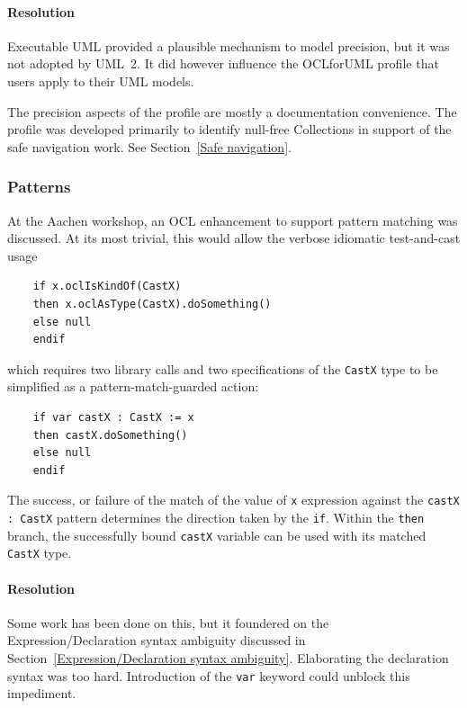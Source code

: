 \documentclass{jot}
\begin{document}
\paragraph{Resolution}

Executable UML \cite{UML-Executable} provided a plausible mechanism to model precision, but it was not adopted by UML~2. It did however influence the OCLforUML profile \cite{Willink-OCLforUML} that users apply to their UML models.

The precision aspects of the profile are mostly a documentation convenience. The profile was developed primarily to identify null-free Collections in support of the safe navigation work. See Section~\ref{Safe navigation}.

\subsubsection{Patterns}\label{Patterns}

At the Aachen \cite{OCL-Aachen} workshop, an OCL enhancement to support pattern matching was discussed. At its most trivial, this would allow the verbose idiomatic test-and-cast usage

\begin{verbatim}		
    if x.oclIsKindOf(CastX)
    then x.oclAsType(CastX).doSomething()
    else null
    endif
\end{verbatim}

which requires two library calls and two specifications of the \verb$CastX$ type to be simplified as a pattern-match-guarded action:

\begin{verbatim}
    if var castX : CastX := x
    then castX.doSomething()
    else null
    endif
\end{verbatim}

The success, or failure of the match of the value of \verb$x$ expression against the \verb$castX : CastX$ pattern determines the direction taken by the \verb$if$. Within the \verb$then$ branch, the successfully bound \verb$castX$ variable can be used with its matched \verb$CastX$ type.

\paragraph{Resolution}

Some work has been done on this, but it foundered on the Expression/Declaration syntax ambiguity discussed in Section~\ref{Expression/Declaration syntax ambiguity}. Elaborating the declaration syntax was too hard. Introduction of the \verb$var$ keyword could unblock this impediment.
\end{document}
